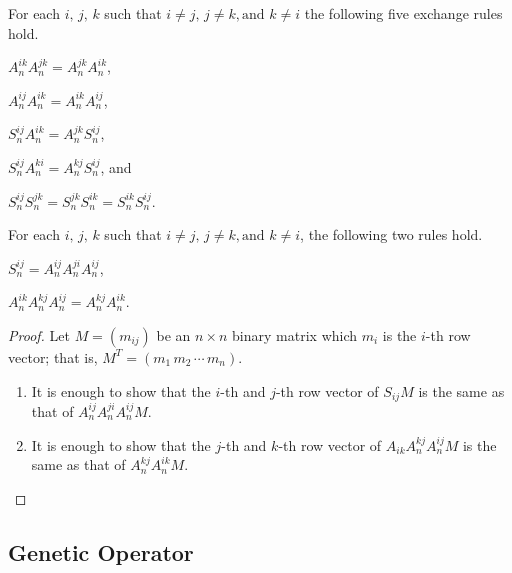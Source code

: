 \begin{proposition}
    For each $ i,\, j,\, k $ such that $ i \neq j,\, j \neq k, \text{and } k \neq i $ the following five exchange rules hold. \\
    \begin{enumerate*}
    \item $ A_n^{ik} A_n^{jk} = A_n^{jk} A_n^{ik} $, 
    \item $ A_n^{ij} A_n^{ik} = A_n^{ik} A_n^{ij} $, 
    \item $ S_n^{ij} A_n^{ik} = A_n^{jk} S_n^{ij} $,
    \item $ S_n^{ij} A_n^{ki} = A_n^{kj} S_n^{ij} $, and 
    \item $ S_n^{ij} S_n^{jk} = S_n^{jk} S_n^{ik} = S_n^{ik} S_n^{ij} $.
    \end{enumerate*}
\end{proposition}

\begin{proposition}
    For each $ i,\, j,\, k $ such that $ i \neq j,\, j \neq k, \text{and } k \neq i $, the following two rules hold. \\
    \begin{enumerate*}
    \item $ S_n^{ij} = A_n^{ij} A_n^{ji} A_n^{ij} $,  
    \item $ A_n^{ik} A_n^{kj} A_n^{ij} = A_n^{kj} A_n^{ik} $.
    \end{enumerate*}
\end{proposition}

\begin{proof}
    Let $ M = (m_{ij}) $ be an $ n \times n $ binary matrix which $ m_i $ is the $ i $-th row vector; that is, $ M^T = (m_1 \, m_2 \, \cdots \, m_n) $.
    \begin{enumerate}
        \item It is enough to show that the $ i $-th and $ j $-th row vector of $ S_{ij} M $ is the same as that of $ A_n^{ij} A_n^{ji} A_n^{ij} M $.
        \item It is enough to show that the $ j $-th and $ k $-th row vector of $ A_{ik} A_n^{kj}A_n^{ij} M $ is the same as that of $ A_n^{kj} A_n^{ik} M $.
    \end{enumerate}
\end{proof}

\subsection{Genetic Operator}

